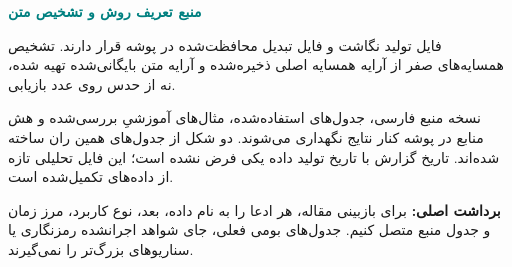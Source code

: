 \documentclass[11pt,a4paper]{article}
\newcommand{\key}[1]{\par\vspace{4pt}\noindent\colorbox{pale}{\parbox{\dimexpr\textwidth-2\fboxsep\relax}{\textbf{برداشت اصلی:} #1}}\par\vspace{3pt}}
\newcommand{\sub}[1]{\par\vspace{3pt}\textbf{\textcolor{teal}{#1}}\par}
\begin{document}
\sub{منبع تعریف روش و تشخیص متن}
فایل تولید نگاشت  و فایل تبدیل محافظت‌شده  در پوشه  قرار دارند. تشخیص همسایه‌های صفر از آرایه همسایه اصلی ذخیره‌شده و آرایه متن بایگانی‌شده تهیه شده، نه از حدس روی عدد بازیابی.

نسخه منبع فارسی، جدول‌های استفاده‌شده، مثال‌های آموزشیِ بررسی‌شده و هش منابع در پوشه  کنار نتایج نگهداری می‌شوند. دو شکل از جدول‌های همین ران ساخته شده‌اند. تاریخ گزارش با تاریخ تولید داده یکی فرض نشده است؛ این فایل تحلیلی تازه از داده‌های تکمیل‌شده است.
\key{برای بازبینی مقاله، هر ادعا را به نام داده، بعد، نوع کاربرد، مرز زمان و جدول منبع متصل کنیم. جدول‌های بومی فعلی، جای شواهد اجرا‌نشده رمزنگاری یا سناریوهای بزرگ‌تر را نمی‌گیرند.}
\end{document}
